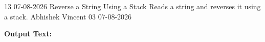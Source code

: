 \clearpage
\label{prog:13}
\programhead
  {13}
  {07-08-2026}
  {Reverse a String Using a Stack}
  {Reads a string and reverses it using a stack.}
  {Abhishek Vincent}
  {03}
  {07-08-2026}

\divider
\textbf{Output Text:}\par
\vspace{2pt}

